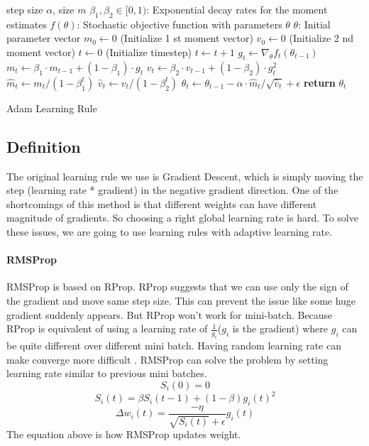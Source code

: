 \documentclass{article}
\begin{document}
\begin{algorithm}[ht]
\begin{algorithmic}
    step size $\alpha$, size $m$
    $\beta_1 , \beta_2 \in [0,1)  $: Exponential decay rates for the moment estimates
    $f(\theta)$: Stochastic objective function with parameters $\theta$
    $\theta$: Initial parameter vector
   \STATE $m_0  \gets 0$ (Initialize 1 st moment vector)
   \STATE $v_0 \gets 0$ (Initialize 2 nd moment vector)
   \STATE $t \gets 0$ (Initialize timestep)   
   \STATE $ t \gets t+1 $
   \STATE $ g_t \gets \nabla_\theta f_t ( \theta_{t-1} )  $
   \STATE $ m_t \gets \beta_1 \cdot m_{t-1} + (1-\beta_1) \cdot g_t $
   \STATE $ v_t \gets \beta_2 \cdot v_{t-1} + (1-\beta_2) \cdot g_t^2 $
   \STATE $ \hat m_t \gets  m_{t} /   (1-\beta_1^t)  $
   \STATE $ \hat v_t \gets  v_{t} /   (1-\beta_2^t)  $
   \STATE $ \theta_t \gets \theta_{t-1} - \alpha \cdot \hat m_{t} / 
   \sqrt{ \hat v_t } + \epsilon $
   \ENDWHILE
   \STATE \textbf{return} $\theta_t$
   
\end{algorithmic}
  \caption{Adam Learning Rule}
  \label{alg:adam}
\end{algorithm}


\subsection{Definition}
The original learning rule we use is Gradient Descent, which is simply moving the step (learning rate * gradient) in the negative gradient direction. One of the shortcomings of this method is that different weights can have different magnitude of gradients. So choosing a right global learning rate is hard. To solve these issues, we are going to use learning rules with adaptive learning rate.

\paragraph{RMSProp} RMSProp \citep{Tieleman2012} is based on RProp\citep{rprop}. RProp suggests that we can use only the sign of the gradient and move same step size. This can prevent the issue like some huge gradient suddenly appears. But RProp won't work for mini-batch. Because RProp is equivalent of using a learning rate of $ \frac{1}{g_i}$($g_i$ is the gradient) where $g_i$ can be quite different over different mini batch. Having random learning rate can make converge more difficult \citep{Tieleman2012}. RMSProp can solve the problem by setting learning rate similar to previous mini batches. 
  $$S_i(0) = 0$$
  $$S_i(t) = \beta S_i(t-1) + (1 - \beta)g_i(t)^2$$
  $$ \Delta w_i(t) = \frac{ -\eta }{ \sqrt{S_i(t)} + \epsilon } g_i(t)$$
  The equation above is how RMSProp updates weight. 
\end{document}
